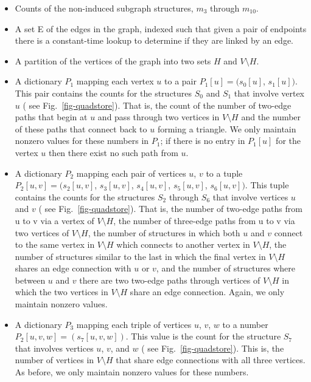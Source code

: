 \documentclass[11pt]{article}
\begin{document}
\begin{itemize}
\item Counts of the non-induced subgraph structures, $m_3$ through $m_{10}$.

\item A set E of the edges in the graph, indexed such that given a pair of endpoints there is a constant-time lookup to determine if they are linked by an edge.

\item A partition of the vertices of the graph into two sets $H$ and $V \setminus H$. 

\item A dictionary $P_1$ mapping each vertex $u$ to a pair $P_1[u] = (s_0[u]$, $s_1[u])$.  This pair contains the counts for the structures $S_0$ and $S_1$ that involve vertex $u$ ( see  Fig.~\ref{fig-quadstore}). That is, the count of the number of two-edge paths that begin at $u$ and pass through two vertices in $V \setminus H$ and the number of these paths that connect back to $u$ forming a triangle.  We only maintain nonzero values for these numbers in $P_1$; if there is no entry in $P_1[u]$ for the vertex $u$ then there exist no such path from $u$.

\item A dictionary $P_2$ mapping each pair of vertices $u$, $v$ to a tuple $P_2[u, v] = (s_2[u,v]$, $s_3[u,v]$, $s_4[u,v]$, $s_5[u,v]$, $s_6[u,v])$.  This tuple contains the counts for the structures $S_2$ through $S_6$ that involve vertices $u$ and $v$ ( see  Fig.~\ref{fig-quadstore}).  That is, the number of two-edge paths from u to v via a vertex of $V \setminus H$, the number of three-edge paths from u to v via two vertices of $V \setminus H$, the number of structures in which both $u$ and $v$ connect to the same vertex in $V \setminus H$ which connects to another vertex in $V \setminus H$, the number of structures similar to the last in which the final vertex in $V \setminus H$ shares an edge connection with $u$ or $v$, and the number of structures where between $u$ and $v$ there are two two-edge paths through vertices of $V \setminus H$ in which the two vertices in $V \setminus H$ share an edge connection.  Again, we only maintain nonzero values.

\item A dictionary $P_3$ mapping each triple of vertices $u$, $v$, $w$  to a number $P_2[u, v, w] = (s_7[u,v,w])$.  This value is the count for the structure $S_7$ that involves vertices $u$, $v$, and $w$ ( see  Fig.~\ref{fig-quadstore}). This is, the number of vertices in $V \setminus H$ that share edge connections with all three vertices.  As before, we only maintain nonzero values for these numbers.


\end{itemize}
\end{document}
